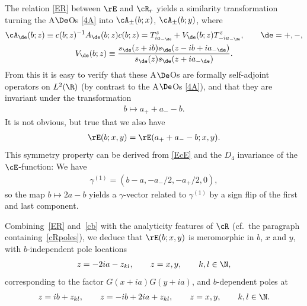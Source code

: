 The relation \eqref{ER} between $\rE$ and $\cR_r$ yields a similarity transformation turning the A$\De$Os \eqref{4A} into $\cA_{\pm}(b;x)$, $\cA_{\pm}(b;y)$,
where
\begin{gather}\label{cAdef}
\cA_{\de}(b;z)\equiv c(b;z)^{-1}A_{\de}(b;z)c(b;z)=T^z_{ia_{-\de}}+V_{\de}(b;z)T^z_{-ia_{-\de}},\qquad \de=+,-,
\\
V_{\de}(b;z)\equiv \frac{s_{\de}(z+ib)s_{\de}(z-ib +ia_{-\de})}{s_{\de}(z)s_{\de}(z+ia_{-\de})}.
\end{gather}
From this it is easy to verify that these A$\De$Os are formally self-adjoint operators on $L^2(\R)$ (by contrast to the A$\De$Os \eqref{4A}), and that they are invariant under the transformation
\begin{gather}\label{bsym}
b \mapsto a_{+}+a_{-}-b.
\end{gather}
It is not obvious, but true that we also have
\begin{gather}\label{Esym}
\rE(b;x,y)=\rE(a_{+}+a_{-}-b;x,y).
\end{gather}
This symmetry property can be derived from \eqref{EcE} and the $D_4$ invariance of the $\cE$-function: We have
\begin{gather}\label{gam1}
\gamma^{(1)}=(b-a,-a_{-}/2,-a_{+}/2,0),
\end{gather}
so the map $b\mapsto 2a-b$ yields a $\gamma$-vector related to $\gamma^{(1)}$ by a sign f\/lip of the f\/irst and last component.

Combining~\eqref{ER} and~\eqref{cb} with the analyticity features of $\cR$ (cf.~the paragraph con\-taining~\eqref{cRpoles}), we deduce that $\rE(b;x,y)$ is meromorphic in $b$, $x$ and $y$, with $b$-independent pole locations
\begin{gather}
z=-2ia-z_{kl},\qquad z=x,y,\qquad k,l\in\N,
\end{gather}
corresponding to the factor $G(x+ia)G(y+ia)$, and $b$-dependent poles at
\begin{gather}
z=ib+z_{kl},\qquad z=-ib+2ia+z_{kl},\qquad z=x,y,\qquad k,l\in\N.
\end{gather}

